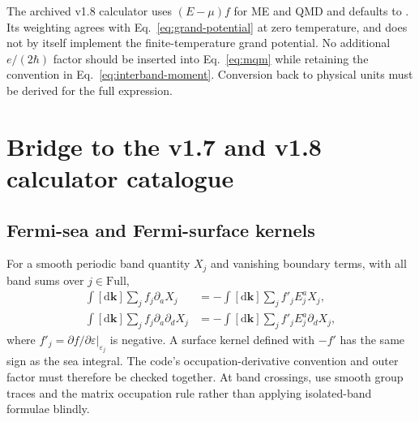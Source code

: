 \documentclass[prx,amsmath,amssymb,superscriptaddress,longbibliography]{revtex4-2}
\newcommand{\dd}{\mathrm{d}}
\newcommand{\code}[1]{\texttt{\detokenize{#1}}}
\begin{document}
The archived v1.8 calculator uses $(E-\mu)f$ for ME and QMD and defaults to
\code{constant_factor=1}. Its weighting agrees with
Eq.~\eqref{eq:grand-potential} at zero temperature, and does not by itself
implement the finite-temperature grand potential.
No additional $e/(2\hbar)$ factor should be inserted into
Eq.~\eqref{eq:mqm} while retaining the convention in Eq.~\eqref{eq:interband-moment}.
Conversion back to physical units must be derived for the full expression.

\section{Bridge to the v1.7 and v1.8 calculator catalogue}
\label{sec:catalogue}

\subsection{Fermi-sea and Fermi-surface kernels}
For a smooth periodic band quantity $X_j$ and vanishing boundary terms,
with all band sums over $j\in\mathrm{Full}$,
\begin{align}
 \int[\dd\bm k]\sum_j f_j\partial_aX_j
 &=-\int[\dd\bm k]\sum_j f'_j E_j^a X_j,\label{eq:sea-surface}\\
 \int[\dd\bm k]\sum_j f_j\partial_a\partial_dX_j
 &=-\int[\dd\bm k]\sum_j f'_j E_j^a\partial_dX_j,
 \label{eq:sea-surface2}
\end{align}
where $f'_j=\partial f/\partial\varepsilon|_{\varepsilon_j}$ is negative.
A surface kernel defined with $-f'$ has the same sign as the sea integral.
The code's occupation-derivative convention and outer factor must therefore
be checked together. At band crossings, use smooth group traces and the
matrix occupation rule rather than applying isolated-band formulae blindly.
\end{document}
